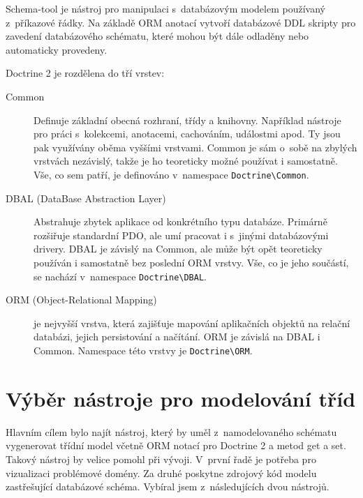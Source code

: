 \documentclass[thesis=B,czech]{FITthesis}[2012/06/26]
\begin{document}
	Schema-tool je nástroj pro manipulaci s~databázovým modelem používaný z~příkazové řádky. Na základě ORM anotací vytvoří databázové DDL skripty pro zavedení databázového schématu, které mohou být dále odladěny nebo automaticky provedeny.
	
	Doctrine 2 je rozdělena do tří vrstev:
	\begin{description}
		\item[Common] Definuje základní obecná rozhraní, třídy a knihovny. Například nástroje pro práci s~kolekcemi, anotacemi, cachováním, událostmi apod. Ty jsou pak využívány oběma vyššími vrstvami. Common je sám o~sobě na zbylých vrstvách nezávislý, takže je ho teoreticky možné používat i samostatně. Vše, co sem patří, je definováno v~namespace \verb|Doctrine\Common|.
		\item[DBAL (DataBase Abstraction Layer)] Abstrahuje zbytek aplikace od konkrétního typu databáze. Primárně rozšiřuje standardní PDO, ale umí pracovat i s~jinými databázovými drivery. DBAL je závislý na Common, ale může být opět teoreticky používán i samostatně bez poslední ORM vrstvy. Vše, co je jeho součástí, se nachází v~namespace \verb|Doctrine\DBAL|.
		\item[ORM (Object-Relational Mapping)] je nejvyšší vrstva, která zajišťuje mapování aplikačních objektů na relační databázi, jejich persistování a načítání. ORM je závislá na DBAL i Common. Namespace této vrstvy je \verb|Doctrine\ORM|.\cite{doctrine2}
	\end{description}

\section{Výběr nástroje pro modelování tříd}
	Hlavním cílem bylo najít nástroj, který by uměl z~namodelovaného schématu vygenerovat třídní model včetně ORM notací pro Doctrine 2 a metod get a set. Takový nástroj by velice pomohl při vývoji. V~první řadě je potřeba pro vizualizaci problémové domény. Za druhé poskytne zdrojový kód modelu zastřešující databázové schéma. Vybíral jsem z~následujících dvou nástrojů.
\end{document}
